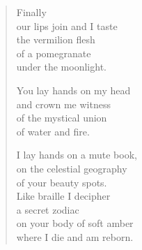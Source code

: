 \documentclass[twocolumn,12pt]{article}
\begin{document}
\begin{verse}
  Finally \\
  our lips join and I taste \\
  the vermilion flesh\\
  of a pomegranate \\
  under the moonlight.

  You lay hands on my head \\
  and crown me witness \\
  of the mystical union \\
  of water and fire.

  I lay hands on a mute book, \\
  on the celestial geography \\
  of your beauty spots. \\
  Like braille I decipher \\
  a secret zodiac \\
  on your body of soft amber \\
  where I die and am reborn.
\end{verse}
\end{document}
